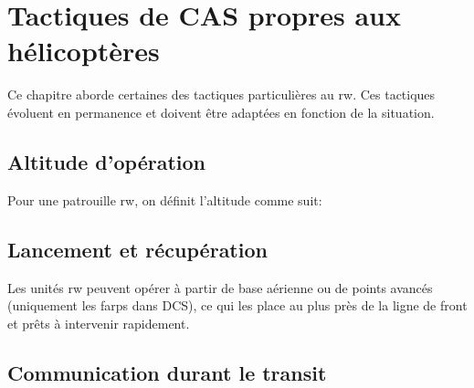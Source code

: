 \newpage
\section{Tactiques de CAS propres aux hélicoptères}

\begin{e1}
	\item Ce chapitre aborde certaines des tactiques particulières au \gls{rw}. Ces tactiques évoluent en permanence et doivent être adaptées en fonction de la situation.
	\item {}
\end{e1}

\subsection{Altitude d'opération}

\begin{e1}
	\item Pour une patrouille \gls{rw}, on définit l'altitude comme suit:
\end{e1}

\subsection{Lancement et récupération}

\begin{e1}
	\item
	Les unités \gls{rw} peuvent opérer à partir de base aérienne ou de points avancés (uniquement les \glspl{farp} dans DCS), ce qui les place au plus près de la ligne de front et prêts à intervenir rapidement.
\end{e1}

\subsection{Communication durant le transit}

